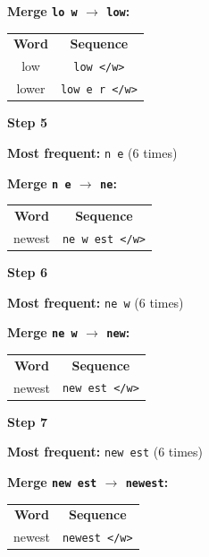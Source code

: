 \noindent\textbf{Merge \texttt{lo w} $\to$ \texttt{low}:}

\begin{center}
\begin{tabular}{c|c}
\textbf{Word} & \textbf{Sequence} \\
low   & \texttt{low </w>} \\
lower & \texttt{low e r </w>} \\
\end{tabular}
\end{center}

\medskip
\noindent\textbf{Step 5}

\noindent\textbf{Most frequent:} \texttt{n e} (6 times)

\noindent\textbf{Merge \texttt{n e} $\to$ \texttt{ne}:}

\begin{center}
\begin{tabular}{c|c}
\textbf{Word} & \textbf{Sequence} \\
newest & \texttt{ne w est </w>} \\
\end{tabular}
\end{center}

\medskip
\noindent\textbf{Step 6}

\noindent\textbf{Most frequent:} \texttt{ne w} (6 times)

\noindent\textbf{Merge \texttt{ne w} $\to$ \texttt{new}:}

\begin{center}
\begin{tabular}{c|c}
\textbf{Word} & \textbf{Sequence} \\
newest & \texttt{new est </w>} \\
\end{tabular}
\end{center}

\medskip
\noindent\textbf{Step 7}

\noindent\textbf{Most frequent:} \texttt{new est} (6 times)

\noindent\textbf{Merge \texttt{new est} $\to$ \texttt{newest}:}

\begin{center}
\begin{tabular}{c|c}
\textbf{Word} & \textbf{Sequence} \\
newest & \texttt{newest </w>} \\
\end{tabular}
\end{center}

